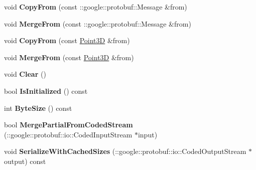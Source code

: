 \begin{DoxyCompactItemize}
void {\bfseries Copy\+From} (const \+::google\+::protobuf\+::\+Message \&from)
\item 
\hypertarget{classstruct_definitions_1_1_point3_d_aa5bda75b679577dbe4d81a6d29fd8a3f}{}\label{classstruct_definitions_1_1_point3_d_aa5bda75b679577dbe4d81a6d29fd8a3f} 
void {\bfseries Merge\+From} (const \+::google\+::protobuf\+::\+Message \&from)
\item 
\hypertarget{classstruct_definitions_1_1_point3_d_acfd0c78fc1d25f2b08c400b25a666d3e}{}\label{classstruct_definitions_1_1_point3_d_acfd0c78fc1d25f2b08c400b25a666d3e} 
void {\bfseries Copy\+From} (const \hyperlink{classstruct_definitions_1_1_point3_d}{Point3D} \&from)
\item 
\hypertarget{classstruct_definitions_1_1_point3_d_a22a282763090ca10e0ad574b12379d4c}{}\label{classstruct_definitions_1_1_point3_d_a22a282763090ca10e0ad574b12379d4c} 
void {\bfseries Merge\+From} (const \hyperlink{classstruct_definitions_1_1_point3_d}{Point3D} \&from)
\item 
\hypertarget{classstruct_definitions_1_1_point3_d_aba58a594f2009a49ca77315c83a73851}{}\label{classstruct_definitions_1_1_point3_d_aba58a594f2009a49ca77315c83a73851} 
void {\bfseries Clear} ()
\item 
\hypertarget{classstruct_definitions_1_1_point3_d_a239d3257e7c767c63b4e4bec15e6b3d6}{}\label{classstruct_definitions_1_1_point3_d_a239d3257e7c767c63b4e4bec15e6b3d6} 
bool {\bfseries Is\+Initialized} () const
\item 
\hypertarget{classstruct_definitions_1_1_point3_d_a8d65908ffbf9ac512e0350bd057181ab}{}\label{classstruct_definitions_1_1_point3_d_a8d65908ffbf9ac512e0350bd057181ab} 
int {\bfseries Byte\+Size} () const
\item 
\hypertarget{classstruct_definitions_1_1_point3_d_a3cbb155d32b15ea944411a47b7f053ab}{}\label{classstruct_definitions_1_1_point3_d_a3cbb155d32b15ea944411a47b7f053ab} 
bool {\bfseries Merge\+Partial\+From\+Coded\+Stream} (\+::google\+::protobuf\+::io\+::\+Coded\+Input\+Stream $\ast$input)
\item 
\hypertarget{classstruct_definitions_1_1_point3_d_aa2f71da58e0959897e7aa8fa500000c8}{}\label{classstruct_definitions_1_1_point3_d_aa2f71da58e0959897e7aa8fa500000c8} 
void {\bfseries Serialize\+With\+Cached\+Sizes} (\+::google\+::protobuf\+::io\+::\+Coded\+Output\+Stream $\ast$output) const
\item 
\hypertarget{classstruct_definitions_1_1_point3_d_ab63545da72646620e59f447a99b3d420}{}\label{classstruct_definitions_1_1_point3_d_ab63545da72646620e59f447a99b3d420} 

\end{DoxyCompactItemize}
